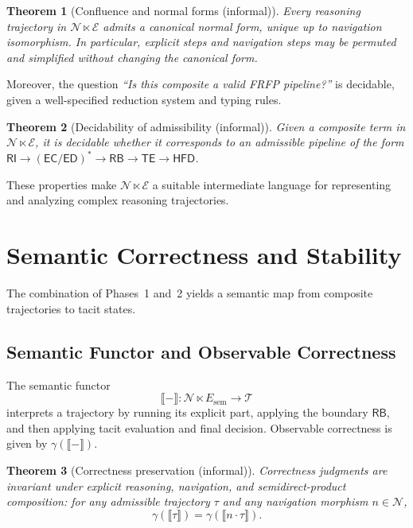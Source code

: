 \documentclass[11pt]{article}
\newtheorem{theorem}{Theorem}[section]
\theoremstyle{definition}
\newcommand{\Ecat}{\mathcal{E}} %
\newcommand{\Tcat}{\mathcal{T}} %
\newcommand{\Ncat}{\mathcal{N}} %
\newcommand{\RB}{\mathsf{RB}}   %
\newcommand{\RI}{\mathsf{RI}}
\newcommand{\EC}{\mathsf{EC}}
\newcommand{\ED}{\mathsf{ED}}
\newcommand{\TE}{\mathsf{TE}}
\newcommand{\HFD}{\mathsf{HFD}}
\begin{document}
\begin{theorem}[Confluence and normal forms (informal)]
Every reasoning trajectory in \(\Ncat \ltimes \Ecat\) admits a
canonical normal form, unique up to navigation isomorphism. In
particular, explicit steps and navigation steps may be permuted and
simplified without changing the canonical form.
\end{theorem}

Moreover, the question \emph{``Is this composite a valid FRFP
pipeline?''} is decidable, given a well-specified reduction system and
typing rules.

\begin{theorem}[Decidability of admissibility (informal)]
Given a composite term in \(\Ncat \ltimes \Ecat\), it is decidable
whether it corresponds to an admissible pipeline of the form
\(\RI \to (\EC/\ED)^\ast \to \RB \to \TE \to \HFD\).
\end{theorem}

These properties make \(\Ncat \ltimes \Ecat\) a suitable intermediate
language for representing and analyzing complex reasoning trajectories.

\section{Semantic Correctness and Stability}
\label{sec:semantics}

The combination of Phases~1 and~2 yields a semantic map from composite
trajectories to tacit states.

\subsection{Semantic Functor and Observable Correctness}

The semantic functor
\[
\llbracket - \rrbracket: \Ncat \ltimes E_{\mathrm{sem}}\to\Tcat
\]
interprets a trajectory by running its explicit part, applying the
boundary \(\RB\), and then applying tacit evaluation and final decision.
Observable correctness is given by \(\gamma(\llbracket - \rrbracket)\).

\begin{theorem}[Correctness preservation (informal)]
Correctness judgments are invariant under explicit reasoning,
navigation, and semidirect-product composition: for any admissible
trajectory \(\tau\) and any navigation morphism \(n\in\Ncat\),
\[
\gamma(\llbracket \tau \rrbracket)
 =
\gamma(\llbracket n\cdot \tau \rrbracket).
\]
\end{theorem}
\end{document}
